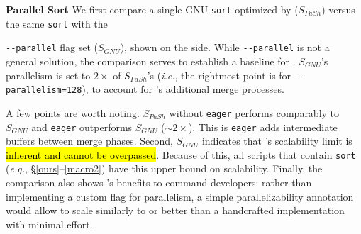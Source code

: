\documentclass[letterpaper,twocolumn,10pt]{article}
\newcommand{\eg}{{\em e.g.}, }
\newcommand{\ie}{{\em i.e.}, }
\newcommand{\heading}[1]{\vspace{4pt}\noindent\textbf{#1}\enspace}
\newcommand{\ttt}[1]{\texttt{#1}}
\newcommand{\todo}[1]{\hl{#1}\xspace}
\newcommand{\kk}[1]{[{\color{magenta}kk: #1}]}
\begin{document}
\heading{Parallel Sort}
We first compare a single GNU \ttt{sort} optimized by \sys ($S_{PaSh}$) versus the same \ttt{sort} with the 
\begin{wrapfigure}{r}{0.25\textwidth}
  \begin{center}
    \texttt{[image: \\detokenize\{./figs/sort\_baseline\_comparison\_scaleup.pdf]}}
  \end{center}
\end{wrapfigure}
\ttt{-{}-parallel} flag set ($S_{GNU}$), shown on the side.
While \ttt{-{}-parallel} is not a general solution, the comparison serves to establish a baseline for \sys.
$S_{GNU}$'s parallelism is set to $2\times$ of $S_{PaSh}$'s (\ie the rightmost point is for \ttt{-{}-parallelism=128}), 
to account for \sys's additional merge processes.

A few points are worth noting.
$S_{PaSh}$ without \ttt{eager} performs comparably to $S_{GNU}$ and \ttt{eager}  outperforms $S_{GNU}$ ($\sim2\times$).
This is \ttt{eager} adds intermediate buffers %
  between merge phases.
Second, $S_{GNU}$ indicates that \sys's scalability limit is \todo{inherent and cannot be overpassed}.
Because of this, all scripts that contain \ttt{sort} (\eg \S\ref{ours}--\ref{macro2}) have this upper bound on scalability.
Finally, the comparison also shows \sys's benefits to command developers:
  rather than implementing a custom flag for parallelism, a simple  parallelizability annotation would allow \sys to scale similarly to or better than a handcrafted implementation with minimal effort.

\end{document}
